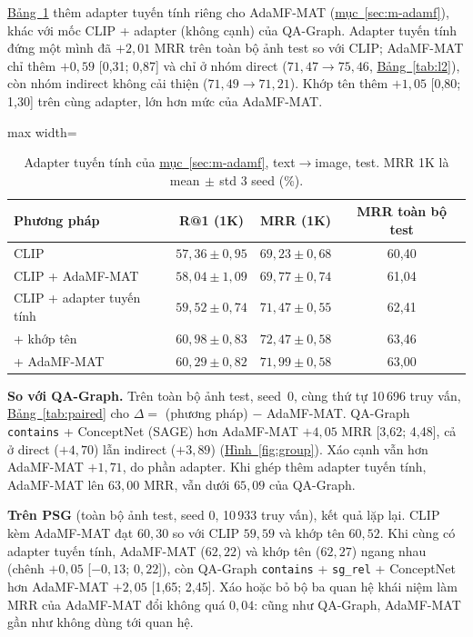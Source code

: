 \documentclass[conference]{IEEEtran}
\begin{document}
\hyperref[tab:adapter]{Bảng~\ref*{tab:adapter}} thêm adapter tuyến tính riêng cho AdaMF-MAT (\hyperref[sec:m-adamf]{mục~\ref*{sec:m-adamf}}), khác với mốc CLIP + adapter (không cạnh) của QA-Graph. Adapter tuyến tính đứng một mình đã $+2{,}01$ MRR trên toàn bộ ảnh test so với CLIP; AdaMF-MAT chỉ thêm $+0{,}59$ [0,31; 0,87] và chỉ ở nhóm direct ($71{,}47\to75{,}46$, \hyperref[tab:l2]{Bảng~\ref*{tab:l2}}), còn nhóm indirect không cải thiện ($71{,}49\to71{,}21$). Khớp tên thêm $+1{,}05$ [0,80; 1,30] trên cùng adapter, lớn hơn mức của AdaMF-MAT.

\begin{table}[t]
\caption{Adapter tuyến tính của \hyperref[sec:m-adamf]{mục~\ref*{sec:m-adamf}}, text$\to$image, test. MRR 1K là mean$\,\pm\,$std 3 seed (\%).}\label{tab:adapter}
\centering\footnotesize
\setlength{\tabcolsep}{3pt}
\begin{adjustbox}{max width=\columnwidth}
\begin{tabular}{lccc}
\toprule
Phương pháp & R@1 (1K) & MRR (1K) & MRR toàn bộ test\\\midrule
CLIP & $57{,}36\pm0{,}95$ & $69{,}23\pm0{,}68$ & 60,40\\
CLIP + AdaMF-MAT & $58{,}04\pm1{,}09$ & $69{,}77\pm0{,}74$ & 61,04\\
CLIP + adapter tuyến tính & $59{,}52\pm0{,}74$ & $71{,}47\pm0{,}55$ & 62,41\\
+ khớp tên & $60{,}98\pm0{,}83$ & $72{,}47\pm0{,}58$ & 63,46\\
+ AdaMF-MAT & $60{,}29\pm0{,}82$ & $71{,}99\pm0{,}58$ & 63,00\\\bottomrule
\end{tabular}
\end{adjustbox}
\end{table}

\textbf{So với QA-Graph.} Trên toàn bộ ảnh test, seed~0, cùng thứ tự 10\,696 truy vấn, \hyperref[tab:paired]{Bảng~\ref*{tab:paired}} cho $\Delta=$ (phương pháp) $-$ AdaMF-MAT. QA-Graph \texttt{contains} + ConceptNet (SAGE) hơn AdaMF-MAT $+4{,}05$ MRR [3,62; 4,48], cả ở direct ($+4{,}70$) lẫn indirect ($+3{,}89$) (\hyperref[fig:group]{Hình~\ref*{fig:group}}). Xáo cạnh vẫn hơn AdaMF-MAT $+1{,}71$, do phần adapter. Khi ghép thêm adapter tuyến tính, AdaMF-MAT lên $63{,}00$ MRR, vẫn dưới $65{,}09$ của QA-Graph.

\textbf{Trên PSG} (toàn bộ ảnh test, seed 0, 10\,933 truy vấn), kết quả lặp lại. CLIP kèm AdaMF-MAT đạt $60{,}30$ so với CLIP $59{,}59$ và khớp tên $60{,}52$. Khi cùng có adapter tuyến tính, AdaMF-MAT ($62{,}22$) và khớp tên ($62{,}27$) ngang nhau (chênh $+0{,}05$ [$-0{,}13$; $0{,}22$]), còn QA-Graph \texttt{contains} + \texttt{sg\_rel} + ConceptNet hơn AdaMF-MAT $+2{,}05$ [1,65; 2,45]. Xáo hoặc bỏ bộ ba quan hệ khái niệm làm MRR của AdaMF-MAT đổi không quá $0{,}04$: cũng như QA-Graph, AdaMF-MAT gần như không dùng tới quan hệ.
\end{document}
